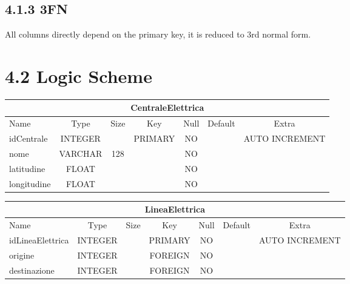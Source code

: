 \subsection * {4.1.3 \hspace {1cm} 3FN}
All columns directly depend on the primary key, it is reduced to 3rd normal form. \\

\section*{4.2 \hspace{1cm} Logic Scheme}

\begin{center}
    \begin{tabular}{ |l|c|c|c|c|c|c| } 
        \hline
        \multicolumn{7}{|c|}{CentraleElettrica} \\
        \hline
            Name        & Type      & Size  & Key       & Null  & Default   & Extra \\
        \hline
            idCentrale  & INTEGER   &       & PRIMARY   & NO    &           & AUTO INCREMENT \\
            nome        & VARCHAR   & 128   &           & NO    &           &                \\
            latitudine  & FLOAT     &       &           & NO    &           &                \\
            longitudine & FLOAT     &       &           & NO    &           &                \\
        \hline
    \end{tabular}
\end{center}


\begin{center}
    \begin{tabular}{ |l|c|c|c|c|c|c| } 
        \hline
        \multicolumn{7}{|c|}{LineaElettrica} \\
        \hline
            Name             & Type     & Size  & Key       & Null  & Default   & Extra \\
        \hline
            idLineaElettrica & INTEGER  &       & PRIMARY   & NO    &           & AUTO INCREMENT \\
            origine          & INTEGER  &       & FOREIGN   & NO    &           & \\
            destinazione     & INTEGER  &       & FOREIGN   & NO    &           & \\
        \hline
    \end{tabular}
\end{center}

